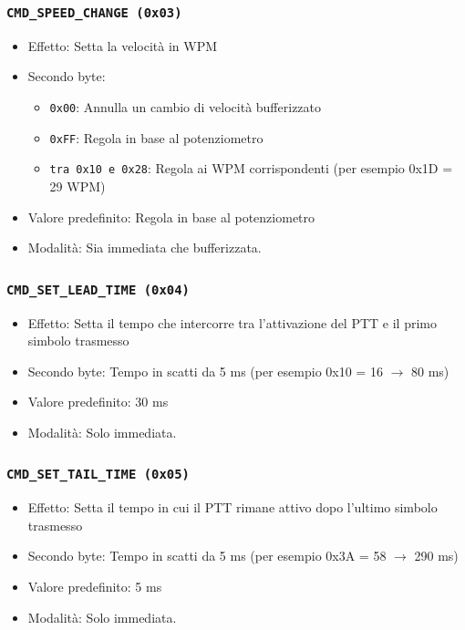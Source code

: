 \subsubsection{\texttt{CMD\_SPEED\_CHANGE (0x03)}}
\begin{itemize}
	\item Effetto: Setta la velocit\`a in WPM
	\item Secondo byte:
	\begin{itemize}
		\item \texttt{0x00}: Annulla un cambio di velocit\`a bufferizzato
		\item \texttt{0xFF}: Regola in base al potenziometro
		\item \texttt{tra 0x10 e 0x28}: Regola ai WPM corrispondenti (per esempio 0x1D = 29 WPM)
	\end{itemize}
	\item Valore predefinito: Regola in base al potenziometro
	\item Modalit\`a: Sia immediata che bufferizzata.
\end{itemize}

\subsubsection{\texttt{CMD\_SET\_LEAD\_TIME (0x04)}}
\begin{itemize}
	\item Effetto: Setta il tempo che intercorre tra l'attivazione del PTT e il primo simbolo trasmesso
	\item Secondo byte: Tempo in scatti da 5 ms (per esempio 0x10 = 16 $\rightarrow$ 80 ms)
	\item Valore predefinito: 30 ms
	\item Modalit\`a: Solo immediata.
\end{itemize}

\subsubsection{\texttt{CMD\_SET\_TAIL\_TIME (0x05)}}
\begin{itemize}
	\item Effetto: Setta il tempo in cui il PTT rimane attivo dopo l'ultimo simbolo trasmesso
	\item Secondo byte: Tempo in scatti da 5 ms (per esempio 0x3A = 58 $\rightarrow$ 290 ms)
	\item Valore predefinito: 5 ms
	\item Modalit\`a: Solo immediata.
\end{itemize}

